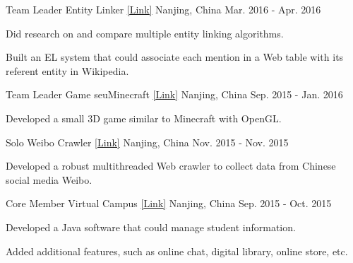 \begin{cventries}
  \cventry
    {Team Leader} %
    {Entity Linker \href{https://github.com/acmom/entity-linker}{[\underline{Link}]}} %
    {Nanjing, China} %
    {Mar. 2016 - Apr. 2016} %
    {
      \begin{cvitems} %
        \item {Did research on and compare multiple entity linking algorithms.}
        \item {Built an EL system that could associate each mention in a Web table with its referent entity in Wikipedia.}
      \end{cvitems}
    }

  \cventry
    {Team Leader} %
    {Game seuMinecraft \href{https://github.com/yanshengjia/openGL/tree/master/lab5}{[\underline{Link}]}} %
    {Nanjing, China} %
    {Sep. 2015 - Jan. 2016} %
    {
      \begin{cvitems} %
        \item {Developed a small 3D game similar to Minecraft with OpenGL.}
      \end{cvitems}
    }

  \cventry
    {Solo} %
    {Weibo Crawler \href{https://github.com/yanshengjia/crawler/tree/master/weiboCrawler}{[\underline{Link}]}} %
    {Nanjing, China} %
    {Nov. 2015 - Nov. 2015} %
    {
      \begin{cvitems} %
        \item {Developed a robust multithreaded Web crawler to collect data from Chinese social media Weibo.}
      \end{cvitems}
    }

  \cventry
    {Core Member} %
    {Virtual Campus \href{https://github.com/acmom/vcampus}{[\underline{Link}]}} %
    {Nanjing, China} %
    {Sep. 2015 - Oct. 2015} %
    {
      \begin{cvitems} %
        \item {Developed a Java software that could manage student information.}
        \item {Added additional features, such as online chat, digital library, online store, etc.}
      \end{cvitems}
    }

\end{cventries}
